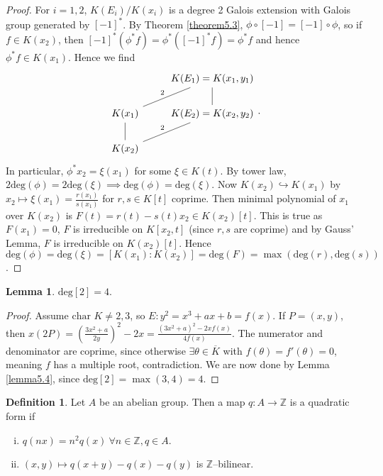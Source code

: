 \documentclass{article}
\theoremstyle{definition}
\newtheorem{lemma}[theorem]{Lemma}
\newtheorem{defn}{Definition}[section]
\begin{document}
\begin{proof}
    For $i=1,2$, $K(E_i)/K(x_i)$ is a degree 2 Galois extension with Galois group generated by $[-1]^*$. By Theorem \ref{theorem5.3}, $\phi \circ [-1] = [-1] \circ \phi$, so if $f \in K(x_2)$, then $[-1]^*(\phi^*f) = \phi^*([-1]^* f) = \phi^* f$ and hence $\phi^* f \in K(x_1)$. Hence we find
    $$\begin{tikzcd}[]
         & K(E_1) = K(x_1,y_1)\\
        K(x_1) & K(E_2) = K(x_2,y_2)\\
        K(x_2) &
        \arrow["2", from=2-1, to=1-2, dash]
        \arrow["2", from=3-1, to=2-2, dash]
        \arrow["", from=2-1, to=3-1, dash]
        \arrow["", from=1-2, to=2-2, dash]
    \end{tikzcd}.$$
    In particular, $\phi^*x_2 = \xi(x_1)$ for some $\xi \in K(t)$. By tower law, $2 \text{deg}(\phi) = 2 \text{deg}(\xi) \implies \text{deg}(\phi) = \text{deg}(\xi)$. Now $K(x_2) \hookrightarrow K(x_1)$ by $x_2 \mapsto \xi(x_1) = \frac{r(x_1)}{s(x_1)}$ for $r,s \in K[t]$ coprime. Then minimal polynomial of $x_1$ over $K(x_2)$ is $F(t) =r(t) -s(t)x_2 \in K(x_2)[t]$. This is true as $F(x_1)=0$, $F$ is irreducible on $K[x_2,t]$ (since $r,s$ are coprime) and by Gauss' Lemma, $F$ is irreducible on $K(x_2)[t]$. Hence $\text{deg}(\phi) = \text{deg}(\xi) = [K(x_1):K(x_2)] = \text{deg}(F) = \max(\text{deg}(r),\text{deg}(s))$.
\end{proof}
\begin{lemma}
    $\text{deg}[2] = 4$.
\end{lemma}
\begin{proof}
    Assume $\text{char }K \neq 2,3$, so $E : y^2 = x^3+ax+b = f(x)$. If $P = (x,y)$, then $x(2P) = \left(\frac{3x^2+a}{2y}\right)^2-2x = \frac{(3x^2+a)^2-2xf(x)}{4f(x)}$. The numerator and denominator are coprime, since otherwise $\exists \theta \in \overline{K}$ with $f(\theta) = f'(\theta) = 0$, meaning $f$ has a multiple root, contradiction. We are now done by Lemma \ref{lemma5.4}, since $\text{deg}[2] = \max(3,4) = 4$.
\end{proof}
\begin{defn}
    Let $A$ be an abelian group. Then a map $q : A \to \mathbb{Z}$ is a quadratic form if
    \begin{enumerate}[(i)]
        \item $q(nx) = n^2q(x)~\forall n \in \mathbb{Z}, q \in A$.
        \item $(x,y) \mapsto q(x+y)-q(x)-q(y)$ is $\mathbb{Z}$--bilinear.
    \end{enumerate}
\end{defn}
\end{document}
